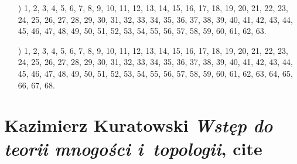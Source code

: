 \documentclass[a4paper,11pt]{article}
\numberwithin{equation}{section}
\begin{document}
\begin{itemize}
\item[\romannumeral8)]  1, 2, 3, 4, 5, 6, 7, 8, 9, 10, 11, 12, 13, 14, 15,
  16, 17, 18, 19, 20, 21, 22, 23, 24, 25, 26, 27, 28, 29, 30, 31, 32, 33,
  34, 35, 36, 37, 38, 39, 40, 41, 42, 43, 44, 45, 46, 47, 48, 49, 50, 51,
  52, 53, 54, 55, 56, 57, 58, 59, 60, 61, 62, 63.

\item[\romannumeral9)] 1, 2, 3, 4, 5, 6, 7, 8, 9, 10, 11, 12, 13, 14, 15,
  16, 17, 18, 19, 20, 21, 22, 23, 24, 25, 26, 27, 28, 29, 30, 31, 32, 33,
  34, 35, 36, 37, 38, 39, 40, 41, 42, 43, 44, 45, 46, 47, 48, 49, 50, 51,
  52, 53, 54, 55, 56, 57, 58, 59, 60, 61, 62, 63, 64, 65, 66, 67, 68.

\end{itemize}










\section{Kazimierz Kuratowski \textit{Wstęp do teorii mnogości
    i~topologii}, cite{}}

\label{sec:Oznaczenia-i-konwencje}
\end{document}

